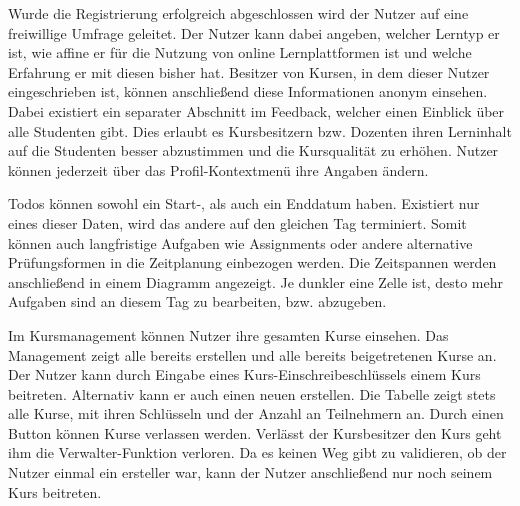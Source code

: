 


Wurde die Registrierung erfolgreich abgeschlossen wird der Nutzer auf eine freiwillige Umfrage geleitet.
Der Nutzer kann dabei angeben, welcher Lerntyp er ist, wie affine er für die Nutzung von online Lernplattformen ist und welche Erfahrung er mit diesen bisher hat.
Besitzer von Kursen, in dem dieser Nutzer eingeschrieben ist, können anschließend diese Informationen anonym einsehen.
Dabei existiert ein separater Abschnitt im Feedback, welcher einen Einblick über alle Studenten gibt.
Dies erlaubt es Kursbesitzern bzw. Dozenten ihren Lerninhalt auf die Studenten besser abzustimmen und die Kursqualität zu erhöhen.
Nutzer können jederzeit über das Profil-Kontextmenü ihre Angaben ändern.


Todos können sowohl ein Start-, als auch ein Enddatum haben.
Existiert nur eines dieser Daten, wird das andere auf den gleichen Tag terminiert.
Somit können auch langfristige Aufgaben wie Assignments oder andere alternative Prüfungsformen in die Zeitplanung einbezogen werden.
Die Zeitspannen werden anschließend in einem Diagramm angezeigt.
Je dunkler eine Zelle ist, desto mehr Aufgaben sind an diesem Tag zu bearbeiten, bzw. abzugeben.



Im Kursmanagement können Nutzer ihre gesamten Kurse einsehen.
Das Management zeigt alle bereits erstellen und alle bereits beigetretenen Kurse an.
Der Nutzer kann durch Eingabe eines Kurs-Einschreibeschlüssels einem Kurs beitreten.
Alternativ kann er auch einen neuen erstellen.
Die Tabelle zeigt stets alle Kurse, mit ihren Schlüsseln und der Anzahl an Teilnehmern an.
Durch einen Button können Kurse verlassen werden.
Verlässt der Kursbesitzer den Kurs geht ihm die Verwalter-Funktion verloren.
Da es keinen Weg gibt zu validieren, ob der Nutzer einmal ein ersteller war, kann der Nutzer anschließend nur noch seinem Kurs beitreten.


